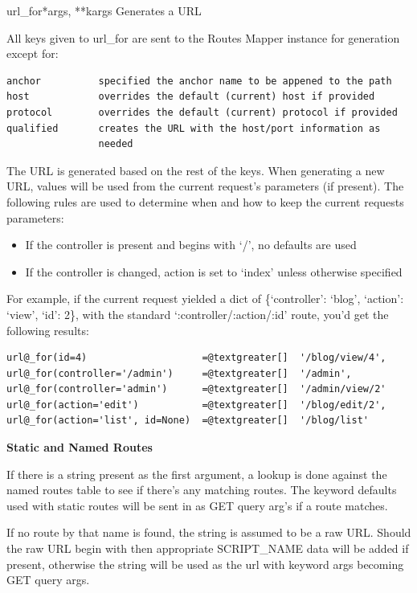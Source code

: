 \documentclass[letterpaper,10pt,english]{manual}
\begin{document}
\hypertarget{routes.util.url\_for}{}\begin{funcdesc}{url\_for}{*args, **kargs}
Generates a URL

All keys given to url\_for are sent to the Routes Mapper instance for 
generation except for:

\begin{Verbatim}[commandchars=@\[\]]
anchor          specified the anchor name to be appened to the path
host            overrides the default (current) host if provided
protocol        overrides the default (current) protocol if provided
qualified       creates the URL with the host/port information as 
                needed
\end{Verbatim}

The URL is generated based on the rest of the keys. When generating a new 
URL, values will be used from the current request's parameters (if 
present). The following rules are used to determine when and how to keep 
the current requests parameters:
\begin{itemize}
\item {} 
If the controller is present and begins with `/', no defaults are used

\item {} 
If the controller is changed, action is set to `index' unless otherwise 
specified

\end{itemize}

For example, if the current request yielded a dict of
\{`controller': `blog', `action': `view', `id': 2\}, with the standard 
`:controller/:action/:id' route, you'd get the following results:

\begin{Verbatim}[commandchars=@\[\]]
url@_for(id=4)                    =@textgreater[]  '/blog/view/4',
url@_for(controller='/admin')     =@textgreater[]  '/admin',
url@_for(controller='admin')      =@textgreater[]  '/admin/view/2'
url@_for(action='edit')           =@textgreater[]  '/blog/edit/2',
url@_for(action='list', id=None)  =@textgreater[]  '/blog/list'
\end{Verbatim}

\textbf{Static and Named Routes}

If there is a string present as the first argument, a lookup is done 
against the named routes table to see if there's any matching routes. The
keyword defaults used with static routes will be sent in as GET query 
arg's if a route matches.

If no route by that name is found, the string is assumed to be a raw URL. 
Should the raw URL begin with \code{/} then appropriate SCRIPT\_NAME data will
be added if present, otherwise the string will be used as the url with 
keyword args becoming GET query args.
\end{funcdesc}
\end{document}
